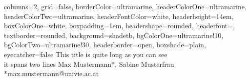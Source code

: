 \documentclass[a0paper,portrait]{baposter}
\begin{document}
\begin{poster}{
  columns=2,
	grid=false,
	borderColor=ultramarine,
	headerColorOne=ultramarine,
	headerColorTwo=ultramarine,
	headerFontColor=white,
  headerheight=14em,
	boxColorOne=white,
  boxpadding=1em,
	headershape=rounded,
	headerfont=\Large\textsf,
	textborder=rounded,
	background=shadetb,
  bgColorOne=ultramarine!10,
  bgColorTwo=ultramarine!30,
	headerborder=open,
  boxshade=plain,
  eyecatcher=false
}
{
}
{ This title is quite long as you can see\\it spans two lines}
{
  \vspace{1em}
  Max Mustermann*, Sabine Musterfrau\\
	{ *max.mustermann@univie.ac.at}
}





\end{poster}
\end{document}
